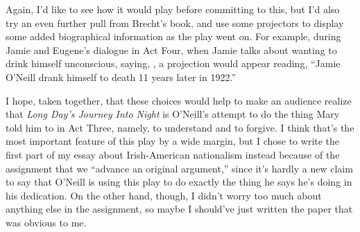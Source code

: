 \documentclass[letterpaper, 12pt]{article}
\newcommand{\ldjin}{\textit{Long Day's Journey Into Night}}
\newcommand{\oneill}{O'Neill}
\begin{document}
Again, I'd like to see how it would play before committing to this, but I'd
also try an even further pull from Brecht's book, and use some projectors to
display some added biographical information as the play went on. For example,
during Jamie and Eugene's dialogue in Act Four, when Jamie talks about wanting
to drink himself unconscious, saying,
, a projection would appear reading,
\enquote{Jamie \oneill{} drank himself to death 11 years later in 1922.}

I hope, taken together, that these choices would help to make an audience
realize that \ldjin{} is \oneill{}'s attempt to do the thing Mary told him to
in Act Three, namely, to understand and to forgive. I think that's the most
important feature of this play by a wide margin, but I chose to write the first
part of my essay about Irish-American nationalism instead because of the
assignment that we \enquote{advance an original argument,} since it's hardly a
new claim to say that \oneill{} is using this play to do exactly the thing he
says he's doing in his dedication. On the other hand, though, I didn't worry
too much about anything else in the assignment, so maybe I should've just
written the paper that was obvious to me.

\printbibliography{}
\end{document}
